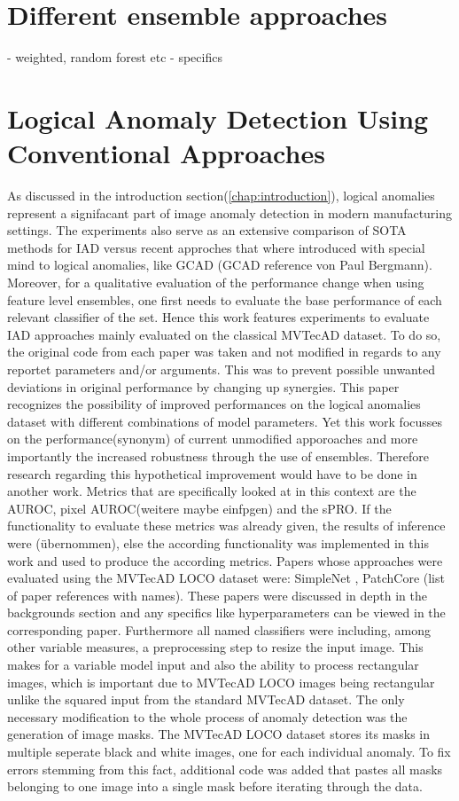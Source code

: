 \section{Different ensemble approaches}
- weighted, random forest etc 
- specifics


\section{Logical Anomaly Detection Using Conventional Approaches}
As discussed in the introduction section(\ref{chap:introduction}), logical anomalies represent a signifacant part of image anomaly detection in modern
manufacturing settings. The experiments also serve as an extensive comparison of SOTA methods for IAD versus recent approches that where 
introduced with special mind to logical anomalies, like GCAD \cite{LOCODentsAndScratchesBergmann2022}(GCAD reference von Paul Bergmann). 
Moreover, for a qualitative evaluation of the performance change when using feature level ensembles, one first needs to evaluate the base performance 
of each relevant classifier of the set. 
Hence this work features experiments to evaluate IAD approaches mainly evaluated on the classical MVTecAD dataset. To do so, the original 
code from each paper was taken and not modified in regards to any reportet parameters and/or arguments. This was to prevent possible unwanted deviations 
in original performance by changing up synergies. This paper recognizes the possibility of improved performances on the logical anomalies dataset 
with different combinations of model parameters. Yet this work focusses on the performance(synonym) of current unmodified apporoaches and 
more importantly the increased robustness through the use of ensembles. Therefore research regarding this hypothetical improvement would 
have to be done in another work. Metrics that are specifically looked at in this context are the AUROC, pixel AUROC(weitere maybe einfpgen) and the sPRO. 
If the functionality to evaluate these metrics was already given, the results of inference were (übernommen), else the according functionality 
was implemented in this work and used to produce the according metrics. 
Papers whose approaches were evaluated using the MVTecAD LOCO dataset were: SimpleNet \cite{liu2023simplenet}, PatchCore \cite{patchCore2022} (list of paper references with names). 
These papers were discussed in depth in the backgrounds section and any specifics like 
hyperparameters can be viewed in the corresponding paper. Furthermore all named classifiers were including, among other variable measures, 
a preprocessing step to resize the input image. This makes for a variable model input and also the ability to process rectangular images, 
which is important due to MVTecAD LOCO images being rectangular unlike the squared input from the standard MVTecAD dataset. The only 
necessary modification to the whole process of anomaly detection was the generation of image masks. The MVTecAD LOCO dataset stores its 
masks in multiple seperate black and white images, one for each individual anomaly. To fix errors stemming from this fact, additional 
code was added that pastes all masks belonging to one image into a single mask before iterating through the data.


